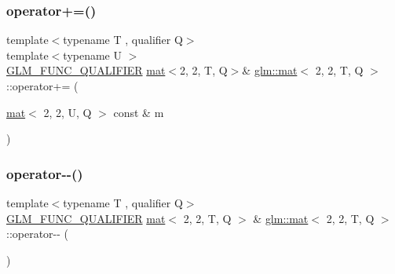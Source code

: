 \mbox{\label{structglm_1_1mat_3_012_00_012_00_01_t_00_01_q_01_4_ac200613a912b6413704bf8aa5677825c}} 
\subsubsection{\texorpdfstring{operator+=()}{operator+=()}\hspace{0.1cm}{\footnotesize\ttfamily [4/4]}}
{\footnotesize\ttfamily template$<$typename T , qualifier Q$>$ \\
template$<$typename U $>$ \\
\mbox{\hyperlink{setup_8hpp_a33fdea6f91c5f834105f7415e2a64407}{G\+L\+M\+\_\+\+F\+U\+N\+C\+\_\+\+Q\+U\+A\+L\+I\+F\+I\+ER}} \mbox{\hyperlink{structglm_1_1mat}{mat}}$<$2, 2, T, Q$>$\& \mbox{\hyperlink{structglm_1_1mat}{glm\+::mat}}$<$ 2, 2, T, Q $>$\+::operator+= (\begin{DoxyParamCaption}\item[{\mbox{\hyperlink{structglm_1_1mat}{mat}}$<$ 2, 2, U, Q $>$ const \&}]{m }\end{DoxyParamCaption})}

\mbox{\label{structglm_1_1mat_3_012_00_012_00_01_t_00_01_q_01_4_a5ce05a8b04a45281df148d4b9a0bd5dc}} 
\subsubsection{\texorpdfstring{operator-\/-\/()}{operator--()}\hspace{0.1cm}{\footnotesize\ttfamily [1/2]}}
{\footnotesize\ttfamily template$<$typename T , qualifier Q$>$ \\
\mbox{\hyperlink{setup_8hpp_a33fdea6f91c5f834105f7415e2a64407}{G\+L\+M\+\_\+\+F\+U\+N\+C\+\_\+\+Q\+U\+A\+L\+I\+F\+I\+ER}} \mbox{\hyperlink{structglm_1_1mat}{mat}}$<$ 2, 2, T, Q $>$ \& \mbox{\hyperlink{structglm_1_1mat}{glm\+::mat}}$<$ 2, 2, T, Q $>$\+::operator-\/-\/ (\begin{DoxyParamCaption}{ }\end{DoxyParamCaption})}

